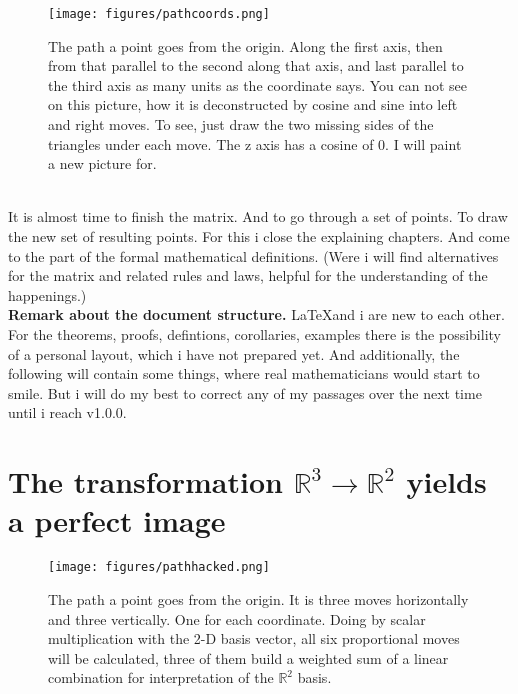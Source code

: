 \documentclass[a4paper]{article}
\begin{document}
\begin{figure}[ht]
\texttt{[image: figures/pathcoords.png]}
\caption{The path a point goes from the origin. Along the first axis, then from that parallel to the second along that axis, and last parallel to the third axis as many units as the coordinate says. You can not see on this picture, how it is deconstructed by cosine and sine into left and right moves. To see, just draw the two missing sides of the triangles under each move. The z axis has a cosine of 0. I will paint a new picture for.}
\end{figure}\\

It is almost time to finish the matrix. And to go through a set of points. To draw the new set of resulting points.
For this i close the explaining chapters. And come to the part of the formal mathematical definitions. (Were i will
find alternatives for the matrix and related rules and laws, helpful for the understanding of the happenings.)\\

\textbf{Remark about the document structure.} \LaTeX and i are new to each other. For the theorems, proofs, defintions, corollaries, examples there is the possibility of a personal layout, which i have not prepared yet. And additionally, the following will contain some things, where real
mathematicians would start to smile. But i will do my best to correct any of my passages over the next time until i reach v1.0.0.\\



\section{The transformation $\mathbb{R}^{3} \rightarrow \mathbb{R}^{2}$ yields a perfect image}

\begin{figure}[ht]
\texttt{[image: figures/pathhacked.png]}
\caption{The path a point goes from the origin. It is three moves horizontally and three vertically. One for each coordinate. Doing by scalar multiplication with the 2-D basis vector, all six proportional moves will be calculated, three of them build a weighted sum of a linear combination for interpretation of the $\mathbb{R}^{2}$ basis.}
\end{figure}\\
\end{document}
